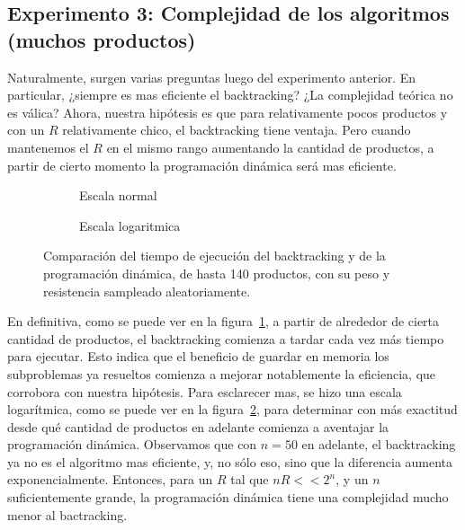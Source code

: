 \documentclass[10pt,a4paper]{article}
\begin{document}
\subsection{Experimento 3: Complejidad de los algoritmos (muchos productos)}

Naturalmente, surgen varias preguntas luego del experimento anterior. En particular, ¿siempre es mas eficiente el backtracking? ¿La complejidad te\'orica no es v\'alica? Ahora, nuestra hip\'otesis es que para relativamente pocos productos y con un $R$ relativamente chico, el backtracking tiene ventaja. Pero cuando mantenemos el $R$ en el mismo rango aumentando la cantidad de productos, a partir de cierto momento la programaci\'on din\'amica ser\'a mas eficiente.

    \begin{figure}[H]
        \centering
        \begin{subfigure}{0.45\linewidth}
            \centering
            
            \caption{Escala normal}
            \label{fig:comparacion-muchos-productos-escala-normal}
        \end{subfigure}
        \begin{subfigure}{0.45\linewidth}
            \centering
            
            \caption{Escala logaritmica}
            \label{fig:comparacion-muchos-productos-escala-log}
        \end{subfigure}
        \caption{Comparaci\'on del tiempo de ejecuci\'on del backtracking y de la programaci\'on din\'amica, de hasta 140 productos, con su peso y resistencia sampleado aleatoriamente.}
        \label{fig:comparacion-muchos-productos}
    \end{figure}
    
En definitiva, como se puede ver en la figura~\ref{fig:comparacion-muchos-productos-escala-normal}, a partir de alrededor de cierta cantidad de productos, el backtracking comienza a tardar cada vez m\'as tiempo para ejecutar. Esto indica que el beneficio de guardar en memoria los subproblemas ya resueltos comienza a mejorar notablemente la eficiencia, que corrobora con nuestra hip\'otesis. Para esclarecer mas, se hizo una escala logar\'itmica, como se puede ver en la figura~\ref{fig:comparacion-muchos-productos-escala-log}, para determinar con m\'as exactitud desde qu\'e cantidad de productos en adelante comienza a aventajar la programaci\'on din\'amica. Observamos que con $n=50$ en adelante, el backtracking ya no es el algoritmo mas eficiente, y, no s\'olo eso, sino que la diferencia aumenta exponencialmente. Entonces, para un $R$ tal que $nR << 2^n$, y un $n$ suficientemente grande, la programaci\'on din\'amica tiene una complejidad mucho menor al bactracking.
\end{document}
